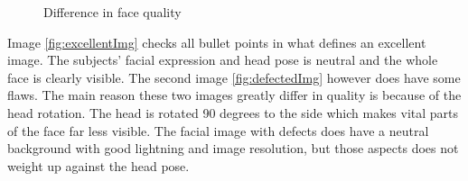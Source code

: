 \begin{figure}[h]
\centering
    \caption{Difference in face quality}
\end{figure}

Image \ref{fig:excellentImg} checks all bullet points in what defines an excellent image. The subjects' facial expression and head pose is neutral and the whole face is clearly visible. The second image \ref{fig:defectedImg} however does have some flaws. The main reason these two images greatly differ in quality is because of the head rotation. The head is rotated 90 degrees to the side which makes vital parts of the face far less visible. The facial image with defects does have a neutral background with good lightning and image resolution, but those aspects does not weight up against the head pose.
\newpage

